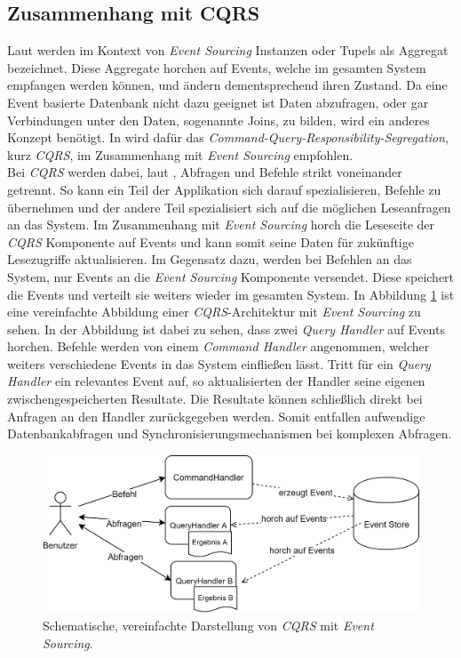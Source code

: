 \subsection{Zusammenhang mit CQRS}
Laut \cite{vernon2013implementing} werden im Kontext von \textit{Event Sourcing} Instanzen oder Tupels als Aggregat bezeichnet. Diese Aggregate horchen auf  Events, welche im gesamten System empfangen werden können, und ändern dementsprechend ihren Zustand. Da eine Event basierte Datenbank nicht dazu geeignet ist Daten abzufragen, oder gar Verbindungen unter den Daten, sogenannte Joins, zu bilden, wird ein anderes Konzept benötigt. In \cite{vernon2013implementing} wird dafür das \textit{Command-Query-Responsibility-Segregation}, kurz \textit{CQRS}, im Zusammenhang mit \textit{Event Sourcing} empfohlen. \\
Bei \textit{CQRS} werden dabei, laut \cite{cqrsYoung2010}, Abfragen und  Befehle strikt voneinander getrennt. So kann ein Teil der Applikation sich darauf spezialisieren, Befehle zu übernehmen und der andere Teil spezialisiert sich auf die möglichen Leseanfragen an das System. Im Zusammenhang mit \textit{Event Sourcing} horch die Leseseite der \textit{CQRS} Komponente auf Events und kann somit seine Daten für zukünftige Lesezugriffe aktualisieren. Im Gegensatz dazu, werden bei Befehlen an das System, nur Events an die \textit{Event Sourcing} Komponente versendet. Diese speichert die Events und verteilt sie weiters wieder im gesamten System. In Abbildung \ref{fig:transactionTheory:eventSourcing:cqrs} ist eine vereinfachte Abbildung einer \textit{CQRS}-Architektur mit \textit{Event Sourcing} zu sehen. In der Abbildung ist dabei zu sehen, dass zwei \textit{Query Handler} auf Events horchen. Befehle werden von einem \textit{Command Handler} angenommen, welcher weiters verschiedene Events in das System einfließen lässt. Tritt für ein \textit{Query Handler} ein relevantes Event auf, so aktualisierten der Handler seine eigenen zwischengespeicherten Resultate. Die Resultate können schließlich direkt bei Anfragen an den Handler zurückgegeben werden. Somit entfallen aufwendige Datenbankabfragen und Synchronisierungsmechanismen bei komplexen Abfragen. \\
\begin{figure}
    \centering
    \includegraphics[width=\linewidth]{gfx/other/eventSourcingCqrs}
    \caption{Schematische, vereinfachte Darstellung von \textit{CQRS} mit \textit{Event Sourcing}.}
    \label{fig:transactionTheory:eventSourcing:cqrs}
\end{figure}
